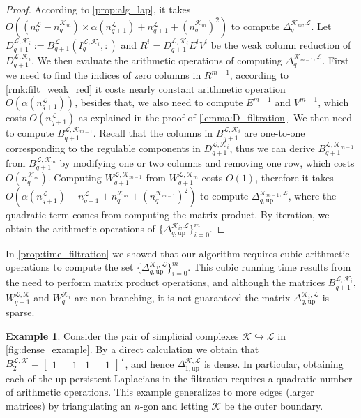 \documentclass{article}
\theoremstyle{definition}
\newtheorem{example}[theorem]{Example}
\newcommand{\KK}{\mathcal{K}}
\newcommand{\LL}{\mathcal{L}}
\begin{document}
\begin{proof}
According to \cref{prop:alg_lap},
it takes $O\left((n_q^\LL-n_q^{\KK_m})\times \alpha(n_{q+1}^\LL) + n_{q+1}^\LL+(n_q^{\KK_m})^2\right)$ to compute $\Delta_q^{\KK_m, \LL}$.
Let $D_{q+1}^{\LL, \KK_i}:=B_{q+1}^\LL(I_{q}^{\LL, \KK_i}, :)$ and $R^{i}=D_{q+1}^{\LL, \KK_i}E^{i}V^{i}$ be the weak column reduction of $D_{q+1}^{\LL, \KK_i}$.
We then evaluate the arithmetic operations of computing $\Delta_q^{\KK_{m-1}, \LL}$.
First we need to find the indices of zero columns in $R^{m-1}$,
according to \cref{rmk:filt_weak_red} it costs nearly constant arithmetic operation $O(\alpha(n_{q+1}^\LL))$,
besides that,
we also need to compute $E^{m-1}$ and $V^{m-1}$,
which costs $O(n_{q+1}^\LL)$ as explained in the proof of \cref{lemma:D_filtration}.
We then need to compute $B_{q+1}^{\LL, \KK_{m-1}}$.
Recall that the columns in $B_{q+1}^{\LL, \KK_i}$ are one-to-one corresponding to the regulable components in $D_{q+1}^{\LL, \KK_i}$,
thus we can derive $B_{q+1}^{\LL, \KK_{m-1}}$ from $B_{q+1}^{\LL, \KK_m}$ by modifying one or two columns and removing one row,
which costs $O(n_{q}^{\KK_m})$.
Computing $W_{q+1}^{\LL, \KK_{m-1}}$ from $W_{q+1}^{\LL, \KK_{m}}$ costs $O(1)$,
therefore it takes $O(\alpha(n_{q+1}^\LL)+n_{q+1}^\LL+n_q^{\KK_m}+(n_{q}^{\KK_{m-1}})^2)$ to compute $\Delta_{q, \mathrm{up}}^{\KK_{m-1}, \LL}$,
where the quadratic term comes from computing the matrix product.
By iteration,
we obtain the arithmetic operations of $\{\Delta_{q, \mathrm{up}}^{\KK_i, \LL}\}_{i=0}^m$.
\end{proof}

In \cref{prop:time_filtration} we showed that our algorithm requires cubic arithmetic operations to compute the set $\{\Delta_{q, \mathrm{up}}^{\KK_i, \LL}\}_{i=0}^m$. This cubic running time results from the need to perform matrix product operations, and although the matrices $B_{q+1}^{\LL, \KK_i}$, $W_{q+1}^{\LL, \KK}$ and $W_q^{\KK_i}$ are non-branching, 
it is not guaranteed the matrix $\Delta_{q, \mathrm{up}}^{\KK_i, \LL}$ is sparse. 

\begin{example}\label{ex:dense}
  Consider the pair of simplicial complexes $\KK\hookrightarrow \LL$ in \cref{fig:dense_example}. By a direct calculation we obtain that 
$B_{2}^{\LL, \KK}
=
\begin{bmatrix}
    1 & -1 & 1 & -1
\end{bmatrix}^T$,
and hence $\Delta_{1, \text{up}}^{\KK, \LL}$ is dense. In particular, obtaining each of the up persistent Laplacians in the filtration requires a quadratic number of arithmetic operations. This example generalizes to more edges (larger matrices) by triangulating an $n$-gon and letting $\KK$ be the outer boundary.


\end{example}
\end{document}
